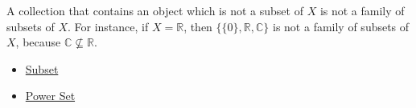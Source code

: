 \begin{remark*}
A collection that contains an object which is not a subset of \(X\) is not a
family of subsets of \(X\).  For instance, if \(X=\mathbb{R}\), then
\(\{\{0\},\mathbb{R},\mathbb{C}\}\) is not a family of subsets of \(X\),
because \(\mathbb{C}\nsubseteq\mathbb{R}\).
\end{remark*}

\begin{dependencies}
\begin{itemize}
  \item \hyperref[def:subset]{Subset}
  \item \hyperref[def:power-set]{Power Set}
\end{itemize}
\end{dependencies}

